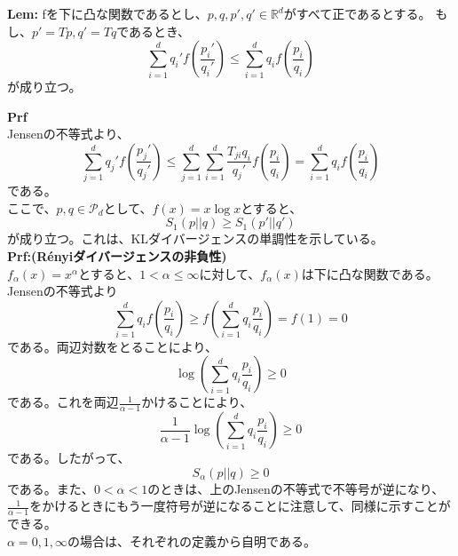 \documentclass[a4paper,11pt]{jsarticle}
\numberwithin{equation}{section}
\begin{document}
\begin{itembox}[l]{\textbf{Lem:}}
    fを下に凸な関数であるとし、$p,q,p',q' \in \mathbb{R}^d$がすべて正であるとする。
    もし、$p' = Tp, q' = Tq$であるとき、
    \begin{equation}
        \sum_{i=1}^{d} q_i'f\left(\frac{p_i'}{q_i'}\right) \leq \sum_{i=1}^{d} q_i f\left(\frac{p_i}{q_i}\right)
    \end{equation}
    が成り立つ。
\end{itembox}
\textbf{Prf}\\
Jensenの不等式より、
\begin{equation}
    \sum_{j=1}^{d}q_j'f\left(\frac{p_j'}{q_j'}\right) \leq \sum_{j=1}^{d}\sum_{i=1}^{d}\frac{T_{ji}q_i}{q_j'}f\left(\frac{p_i}{q_i}\right)=\sum_{i=1}^{d}q_i f\left(\frac{p_i}{q_i}\right)
\end{equation}
である。\hfill \qedsymbol\\
ここで、$p,q \in \mathcal{P}_d$として、$f(x)=x\log x$とすると、
\begin{equation}
    S_1 (p||q) \geq S_1 (p'||q')
\end{equation}
が成り立つ。これは、KLダイバージェンスの単調性を示している。\\

\textbf{Prf:(Rényiダイバージェンスの非負性)}\\
$f_{\alpha}(x) = x^{\alpha}$とすると、$1<\alpha \leq \infty$に対して、$f_{\alpha}(x)$は下に凸な関数である。\\
Jensenの不等式より
\begin{equation}
    \sum_{i=1}^{d}q_i f(\frac{p_i}{q_i}) \geq f(\sum_{i=1}^{d}q_i \frac{p_i}{q_i}) = f(1) = 0
\end{equation}
である。両辺対数をとることにより、
\begin{equation}
    \log(\sum_{i=1}^{d}q_i \frac{p_i}{q_i}) \geq 0
\end{equation}
である。これを両辺$\frac{1}{\alpha - 1}$かけることにより、
\begin{equation}
    \frac{1}{\alpha - 1}\log(\sum_{i=1}^{d}q_i \frac{p_i}{q_i}) \geq 0
\end{equation}
である。したがって、
\begin{equation}
    S_{\alpha}(p||q) \geq 0
\end{equation}
である。また、$0 < \alpha <1$のときは、上のJensenの不等式で不等号が逆になり、$\frac{1}{\alpha-1}$をかけるときにもう一度符号が逆になることに注意して、同様に示すことができる。\\
$\alpha =0,1,\infty$の場合は、それぞれの定義から自明である。\\  
\hfill \qedsymbol\\
\end{document}
